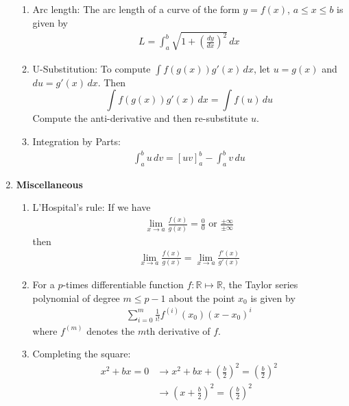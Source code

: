 \documentclass[10pt]{article}
\begin{document}
\begin{multicols}{2}
\begin{enumerate}
\begin{enumerate}
    
    \item Arc length: The arc length of a curve of the form $y=f(x)$, $a \leq x \leq b$ is given by 
    \begin{align*}
        L = \int_a^b \sqrt{1 + \left(\frac{dy}{dx}\right)^2} \, dx
    \end{align*}
    \item U-Substitution: To compute $\int f(g(x))g'(x) \, dx$, let $u=g(x)$ and $du = g'(x) \, dx$. Then $$\int f(g(x))g'(x) \, dx = \int f(u) \, du$$
    Compute the anti-derivative and then re-substitute $u$.
    
    \item Integration by Parts: 
    \begin{align*}
        \int_a^b u \, dv = [uv]_a^b - \int_a^b v \, du
    \end{align*}
    \end{enumerate}
    
    \item \textbf{Miscellaneous}
    \begin{enumerate}
        \item L’Hospital’s rule:
        If we have 
        \begin{align*}
            \lim_{x \rightarrow a} \frac{f(x)}{g(x)} = \frac{0}{0} \text{ or } \frac{\pm\infty}{\pm\infty}
        \end{align*}
        then 
        \begin{align*}
            \lim_{x \rightarrow a} \frac{f(x)}{g(x)} = \lim_{x \rightarrow a} \frac{f'(x)}{g'(x)}
        \end{align*}
        \item For a $p$-times differentiable function $f: \mathbb{R} \mapsto \mathbb{R}$, the Taylor series polynomial of degree $m \leq p - 1$ about the point $x_0$ is given by
        \begin{align}
        \sum_{i = 0}^m \frac{1}{i!} f^{(i)}(x_0) (x - x_0)^i 
        \end{align}
        where $f^{(m)}$ denotes the $m$th derivative of $f$.
        \item Completing the square: 
        \begin{align*}
            x^2 + bx = 0 &\rightarrow x^2 + bx + \left(\frac{b}{2}\right)^2 = \left(\frac{b}{2}\right)^2 \\ & \rightarrow \left(x+\frac{b}{2}\right)^2 = \left(\frac{b}{2}\right)^2
        \end{align*}
    \end{enumerate}
\end{enumerate}
\end{multicols}
\end{document}
